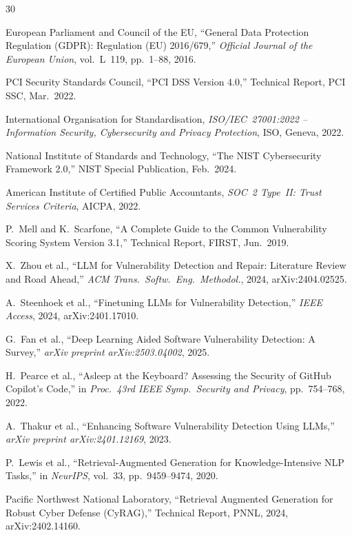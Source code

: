 \documentclass[conference]{IEEEtran}
\begin{document}
\begin{thebibliography}{30}

European Parliament and Council of the EU,
``General Data Protection Regulation (GDPR): Regulation (EU) 2016/679,''
\textit{Official Journal of the European Union}, vol.~L~119, pp.~1--88, 2016.

PCI Security Standards Council,
``PCI DSS Version 4.0,''
Technical Report, PCI SSC, Mar.~2022.

International Organisation for Standardisation,
\textit{ISO/IEC~27001:2022 -- Information Security, Cybersecurity and
Privacy Protection},
ISO, Geneva, 2022.

National Institute of Standards and Technology,
``The NIST Cybersecurity Framework 2.0,''
NIST Special Publication, Feb.~2024.

American Institute of Certified Public Accountants,
\textit{SOC~2 Type~II: Trust Services Criteria},
AICPA, 2022.

P.~Mell and K.~Scarfone,
``A Complete Guide to the Common Vulnerability Scoring System Version 3.1,''
Technical Report, FIRST, Jun.~2019.

X.~Zhou et al.,
``LLM for Vulnerability Detection and Repair: Literature Review and Road Ahead,''
\textit{ACM Trans.\ Softw.\ Eng.\ Methodol.}, 2024, arXiv:2404.02525.

A.~Steenhoek et al.,
``Finetuning LLMs for Vulnerability Detection,''
\textit{IEEE Access}, 2024, arXiv:2401.17010.

G.~Fan et al.,
``Deep Learning Aided Software Vulnerability Detection: A Survey,''
\textit{arXiv preprint arXiv:2503.04002}, 2025.

H.~Pearce et al.,
``Asleep at the Keyboard? Assessing the Security of GitHub Copilot's Code,''
in \textit{Proc.\ 43rd IEEE Symp.\ Security and Privacy}, pp.~754--768, 2022.

A.~Thakur et al.,
``Enhancing Software Vulnerability Detection Using LLMs,''
\textit{arXiv preprint arXiv:2401.12169}, 2023.

P.~Lewis et al.,
``Retrieval-Augmented Generation for Knowledge-Intensive NLP Tasks,''
in \textit{NeurIPS}, vol.~33, pp.~9459--9474, 2020.

Pacific Northwest National Laboratory,
``Retrieval Augmented Generation for Robust Cyber Defense (CyRAG),''
Technical Report, PNNL, 2024, arXiv:2402.14160.


\end{thebibliography}
\end{document}
